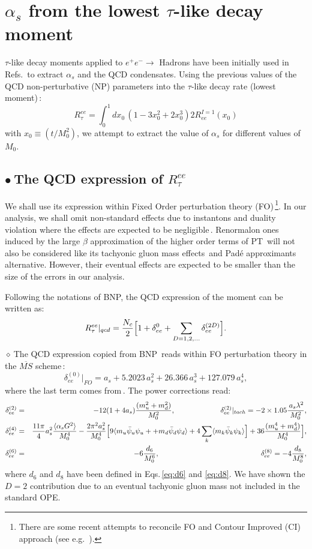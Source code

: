 \documentclass[review]{elsarticle}
\def\beq{\begin{equation}}
\def\eeq{\end{equation}}
\def\bea{\begin{eqnarray}}
\def\eea{\end{eqnarray}}
\def\nnb{\nonumber}
\def\nnb{\nonumber}
\def\la{\langle}
\def\ra{\rangle}
\def\b{$\bullet~$}
\def\d{$\diamond~$}
\begin{document}
  \section{$\alpha_s$ from the lowest $\tau$-like decay moment}
  $\tau$-like decay moments applied to $e^+e^-\to$ Hadrons have been initially used in Refs.\,\cite{SNPICH,SN95} to extract $\alpha_s$ and the QCD condensates. 
  Using the previous values of the QCD non-perturbative (NP) parameters into the $\tau$-like decay rate (lowest moment)\,\cite{BNP}:
  \beq
  R^{ee}_{\tau}=\int_0^{1} dx_0\, (1-3x_0^2+2x_0^3)2R^{I=1}_{ee}(x_0)
  \eeq
  with $x_0\equiv (t/M^2_0)$, we attempt to extract the value of $\alpha_s$ for different values of $M_0$.
  \subsection*{\b The QCD expression of $ R^{ee}_{\tau}$}
 We shall use its expression  within Fixed Order perturbation theory (FO)\,\footnote{There are some recent attempts to reconcile FO and Contour Improved (CI) approach (see e.g. \,\cite{JAMIN}).}. In our analysis, we shall omit non-standard effects due to  instantons and duality violation where the effects are expected to be negligible\,\cite{PICH2,SNTAU}.  Renormalon ones induced by the large $\beta$ approximation of the higher order terms of PT\,\cite{RENORM,AYALA} will not also be considered like its tachyonic gluon mass effects\,\cite{ZAKA} and Pad\'e approximants alternative. However, their eventual effects are expected to be smaller than the size of the errors in our analysis. 
  
  Following the notations of BNP, the QCD expression of the moment can be written as:
  \beq
  R^{ee}_{\tau}\vert_{qcd}= \frac{N_c}{2}\Big{[} 1+\delta_{ee}^{0}+\sum_{D=1,2,\dots}\delta_{ee}^{(2D)}\Big{]}.
  \eeq
 \d The QCD expression copied from BNP\,\cite{BNP} reads within FO perturbation theory in the $\overline{MS}$ scheme\,:
  \beq
  \delta^{(0)}_{ee}\vert_{FO}=a_s+5.2023\,a_s^2+26.366\,a_s^3+ 127.079\,a_s^4,
  \eeq
  where the last term comes from\,\cite{CHET4}.  The power corrections read:
  \bea
   \delta^{(2)}_{ee}&=&-12(1+4a_s)\frac{(m_u^2+m_d^2)}{M_0^2},\,\,\,\,\,\,\,\,\,\,\,\,\,\,\,\,\,\,\,\,\,\,\,\,\,\,\,\,\,\,\,\,\,\,\,\,\,
   \delta^{(2)}_{ee}\vert_{tach}=-2\times 1.05\frac{\,a_s\lambda^2}{M_0^2},\nnb\\
   \delta^{(4)}_{ee}&=&\frac{11\pi}{4}a_s^2\frac{\la\alpha_s G^2\ra}{M_0^4}
  -\frac{2\pi^2a_s^2}{M_0^4}\Big{[} 9\la m_u\bar \psi_u\psi_u++m_d\bar\psi_d\psi_d \ra+4\sum_k \la m_k\bar \psi_k\psi_k\ra\Big{]}+36\frac{(m_u^4+m_d^4)}{M_0^4}\Big{]},\nnb\\
   \delta^{(6)}_{ee}&=& -6\frac{d_6}{M_0^6},\,\,\,\,\,\,\,\,\,\,\,\,\,\,\,\,\,\,\,\,\,\,\,\,\,\,\,\,\,\,\,\,\,\,\,\,\,\,\,\,\,\,\,\,\,\,\,\,\,\,\,\,\,\,\,\,\,\,\,\,\,\,\,\,\,\,\,\,\,\,\,\,\,\,\,\,\,\,\,\,\,\,\,
   \delta_{ee}^{(8)}= -4\frac{d_8}{M_0^8},
  \eea
  where $d_{6}$ and $d_{8}$ have been defined in Eqs.\,\ref{eq:d6} and \ref{eq:d8}. We have shown the $D=2$ contribution due to an eventual tachyonic gluon mass not included in the standard OPE. 
  
\end{document}
